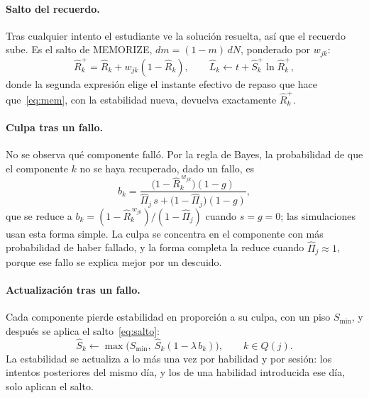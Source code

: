 \documentclass[runningheads]{llncs}
\newcommand{\Rh}{\hat R}
\newcommand{\Sh}{\hat S}
\newcommand{\Lh}{\hat L}
\newcommand{\Pih}{\hat\Pi}
\newcommand{\Smin}{S_{\min}}
\begin{document}
\paragraph{Salto del recuerdo.} Tras cualquier intento el estudiante ve la solución resuelta, así que el recuerdo sube. Es el salto de MEMORIZE, $dm=(1-m)\,dN$, ponderado por $w_{jk}$:
\begin{equation}
\Rh_k^{+}=\Rh_k+w_{jk}(1-\Rh_k),\qquad \Lh_k\leftarrow t+\Sh_k^{+}\ln\Rh_k^{+},
\label{eq:salto}
\end{equation}
donde la segunda expresión elige el instante efectivo de repaso que hace que~\eqref{eq:mem}, con la estabilidad nueva, devuelva exactamente $\Rh_k^{+}$.

\paragraph{Culpa tras un fallo.} No se observa qué componente falló. Por la regla de Bayes, la probabilidad de que el componente $k$ no se haya recuperado, dado un fallo, es
\begin{equation}
b_k=\frac{\bigl(1-\Rh_k^{\,w_{jk}}\bigr)(1-g)}{\Pih_j\,s+\bigl(1-\Pih_j\bigr)(1-g)},
\label{eq:culpa}
\end{equation}
que se reduce a $b_k=(1-\Rh_k^{\,w_{jk}})/(1-\Pih_j)$ cuando $s=g=0$; las simulaciones usan esta forma simple. La culpa se concentra en el componente con más probabilidad de haber fallado, y la forma completa la reduce cuando $\Pih_j\approx1$, porque ese fallo se explica mejor por un descuido.

\paragraph{Actualización tras un fallo.} Cada componente pierde estabilidad en proporción a su culpa, con un piso $\Smin$, y después se aplica el salto~\eqref{eq:salto}:
\begin{equation}
\Sh_k\leftarrow\max\bigl(\Smin,\ \Sh_k(1-\lambda\,b_k)\bigr),\qquad k\in Q(j).
\label{eq:fallo}
\end{equation}
La estabilidad se actualiza a lo más una vez por habilidad y por sesión: los intentos posteriores del mismo día, y los de una habilidad introducida ese día, solo aplican el salto.
\end{document}
